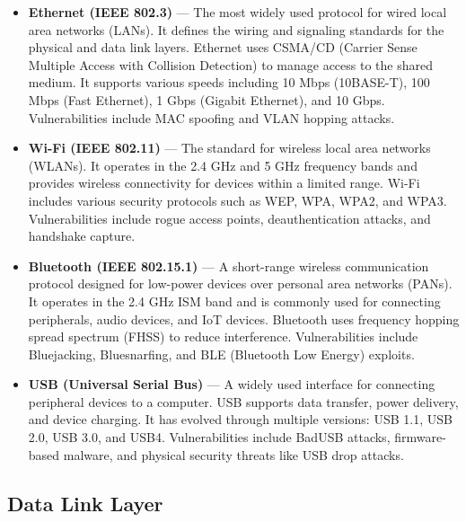 \documentclass[12pt,a4paper]{article}
\begin{document}
\begin{itemize}
    \item \textbf{Ethernet (IEEE 802.3)} --- The most widely used protocol for wired local area networks (LANs). It defines the wiring and signaling standards for the physical and data link layers. Ethernet uses CSMA/CD (Carrier Sense Multiple Access with Collision Detection) to manage access to the shared medium. It supports various speeds including 10 Mbps (10BASE-T), 100 Mbps (Fast Ethernet), 1 Gbps (Gigabit Ethernet), and 10 Gbps. Vulnerabilities include MAC spoofing and VLAN hopping attacks.
    \item \textbf{Wi-Fi (IEEE 802.11)} --- The standard for wireless local area networks (WLANs). It operates in the 2.4 GHz and 5 GHz frequency bands and provides wireless connectivity for devices within a limited range. Wi-Fi includes various security protocols such as WEP, WPA, WPA2, and WPA3. Vulnerabilities include rogue access points, deauthentication attacks, and handshake capture.
    \item \textbf{Bluetooth (IEEE 802.15.1)} --- A short-range wireless communication protocol designed for low-power devices over personal area networks (PANs). It operates in the 2.4 GHz ISM band and is commonly used for connecting peripherals, audio devices, and IoT devices. Bluetooth uses frequency hopping spread spectrum (FHSS) to reduce interference. Vulnerabilities include Bluejacking, Bluesnarfing, and BLE (Bluetooth Low Energy) exploits.
    \item \textbf{USB (Universal Serial Bus)} --- A widely used interface for connecting peripheral devices to a computer. USB supports data transfer, power delivery, and device charging. It has evolved through multiple versions: USB 1.1, USB 2.0, USB 3.0, and USB4. Vulnerabilities include BadUSB attacks, firmware-based malware, and physical security threats like USB drop attacks.
\end{itemize}

\subsection{Data Link Layer}
\end{document}
